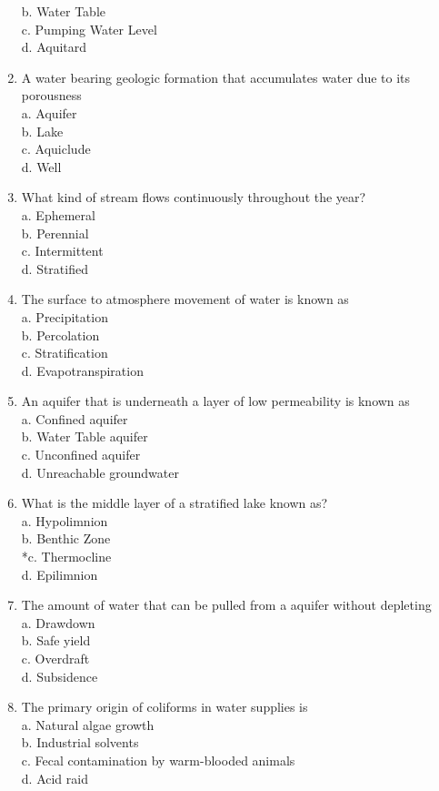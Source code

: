 \begin{enumerate}
b. Water Table\\
c. Pumping Water Level\\
d. Aquitard\\
\item A water bearing geologic formation that accumulates water due to its porousness\\
a. Aquifer\\
b. Lake\\
c. Aquiclude\\
d. Well\\
\item What kind of stream flows continuously throughout the year?\\
a. Ephemeral\\
b. Perennial\\
c. Intermittent\\
d. Stratified\\
\item The surface to atmosphere movement of water is known as\\
a. Precipitation\\
b. Percolation\\
c. Stratification\\
d. Evapotranspiration\\
\item An aquifer that is underneath a layer of low permeability is known as\\
a. Confined aquifer\\
b. Water Table aquifer\\
c. Unconfined aquifer\\
d. Unreachable groundwater\\
\item What is the middle layer of a stratified lake known as?\\
a. Hypolimnion\\
b. Benthic Zone\\
*c. Thermocline\\
d. Epilimnion\\
\item The amount of water that can be pulled from a aquifer without depleting\\
a. Drawdown\\
b. Safe yield\\
c. Overdraft\\
d. Subsidence\\
\item The primary origin of coliforms in water supplies is\\
a. Natural algae growth\\
b. Industrial solvents\\
c. Fecal contamination by warm-blooded animals\\
d. Acid raid 


\end{enumerate}
